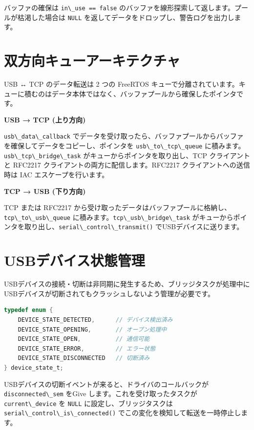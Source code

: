 \documentclass[10pt,twoside,openany,a4j]{ltjsbook}
\newcommand{\passthrough}[1]{#1}
\begin{document}
バッファの確保は \passthrough{\lstinline!in\_use == false!}
のバッファを線形探索して返します。プールが枯渇した場合は
\passthrough{\lstinline!NULL!}
を返してデータをドロップし、警告ログを出力します。

\section{双方向キューアーキテクチャ}\label{ux53ccux65b9ux5411ux30adux30e5ux30fcux30a2ux30fcux30adux30c6ux30afux30c1ux30e3}

USB ↔ TCP のデータ転送は 2 つの FreeRTOS
キューで分離されています。キューに積むのはデータ本体ではなく、バッファプールから確保したポインタです。

\textbf{USB → TCP (上り方向)}

\passthrough{\lstinline!usb\_data\_callback!}
でデータを受け取ったら、バッファプールからバッファを確保してデータをコピーし、ポインタを
\passthrough{\lstinline!usb\_to\_tcp\_queue!}
に積みます。\passthrough{\lstinline!usb\_tcp\_bridge\_task!}
がキューからポインタを取り出し、TCP クライアントと RFC2217
クライアントの両方に配信します。RFC2217 クライアントへの送信時は IAC
エスケープを行います。

\textbf{TCP → USB (下り方向)}

TCP または RFC2217
から受け取ったデータはバッファプールに格納し、\passthrough{\lstinline!tcp\_to\_usb\_queue!}
に積みます。\passthrough{\lstinline!tcp\_usb\_bridge\_task!}
がキューからポインタを取り出し、\passthrough{\lstinline!serial\_control\_transmit()!}
でUSBデバイスに送ります。

\section{USBデバイス状態管理}\label{usbux30c7ux30d0ux30a4ux30b9ux72b6ux614bux7ba1ux7406}

USBデバイスの接続・切断は非同期に発生するため、ブリッジタスクが処理中にUSBデバイスが切断されてもクラッシュしないよう管理が必要です。

\begin{lstlisting}[language=C]
typedef enum {
    DEVICE_STATE_DETECTED,      // デバイス検出済み
    DEVICE_STATE_OPENING,       // オープン処理中
    DEVICE_STATE_OPEN,          // 通信可能
    DEVICE_STATE_ERROR,         // エラー状態
    DEVICE_STATE_DISCONNECTED   // 切断済み
} device_state_t;
\end{lstlisting}

USBデバイスの切断イベントが来ると、ドライバのコールバックが
\passthrough{\lstinline!disconnected\_sem!} をGive
します。これを受け取ったタスクが
\passthrough{\lstinline!current\_device!} を
\passthrough{\lstinline!NULL!} に設定し、ブリッジタスクは
\passthrough{\lstinline!serial\_control\_is\_connected()!}
でこの変化を検知して転送を一時停止します。
\end{document}

